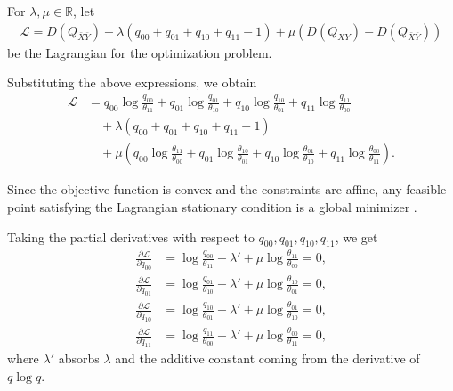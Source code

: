 \documentclass[journal,onecolumn]{IEEEtran}
\theoremstyle{definition}
\theoremstyle{remark}
\newcommand{\Dxy}{D({Q_{XY}})}
\newcommand{\Dbxby}{D({Q_{\bar{X}\bar{Y}}})}
\begin{document}
    For $\lambda,\mu \in \mathbb{R}$, let
    \begin{align*}
        \mathcal{L}
        =
        \Dbxby
        +
        \lambda(q_{00}+q_{01}+q_{10}+q_{11}-1)
        +
        \mu(\Dxy-\Dbxby)
    \end{align*}
    be the Lagrangian for the optimization problem.

    Substituting the above expressions, we obtain
    \begin{align*}
        \mathcal{L}
        &=
        q_{00}\log\frac{q_{00}}{\theta_{11}}
        +
        q_{01}\log\frac{q_{01}}{\theta_{10}}
        +
        q_{10}\log\frac{q_{10}}{\theta_{01}}
        +
        q_{11}\log\frac{q_{11}}{\theta_{00}}
        \\
        &\quad
        +
        \lambda(q_{00}+q_{01}+q_{10}+q_{11}-1)
        \\
        &\quad
        +
        \mu\left(
            q_{00}\log\frac{\theta_{11}}{\theta_{00}}
            +
            q_{01}\log\frac{\theta_{10}}{\theta_{01}}
            +
            q_{10}\log\frac{\theta_{01}}{\theta_{10}}
            +
            q_{11}\log\frac{\theta_{00}}{\theta_{11}}
        \right).
    \end{align*}

    Since the objective function is convex and the constraints are affine,
    any feasible point satisfying the Lagrangian stationary condition is a global minimizer \cite{BV09}.

    Taking the partial derivatives with respect to $q_{00},q_{01},q_{10},q_{11}$, we get
    \begin{align*}
        \frac{\partial\mathcal{L}}{\partial q_{00}}
        &=
        \log\frac{q_{00}}{\theta_{11}}
        +
        \lambda'
        +
        \mu\log\frac{\theta_{11}}{\theta_{00}}
        =0,
        \\
        \frac{\partial\mathcal{L}}{\partial q_{01}}
        &=
        \log\frac{q_{01}}{\theta_{10}}
        +
        \lambda'
        +
        \mu\log\frac{\theta_{10}}{\theta_{01}}
        =0,
        \\
        \frac{\partial\mathcal{L}}{\partial q_{10}}
        &=
        \log\frac{q_{10}}{\theta_{01}}
        +
        \lambda'
        +
        \mu\log\frac{\theta_{01}}{\theta_{10}}
        =0,
        \\
        \frac{\partial\mathcal{L}}{\partial q_{11}}
        &=
        \log\frac{q_{11}}{\theta_{00}}
        +
        \lambda'
        +
        \mu\log\frac{\theta_{00}}{\theta_{11}}
        =0,
    \end{align*}
    where $\lambda'$ absorbs $\lambda$ and the additive constant coming from the derivative of $q\log q$.
\end{document}
